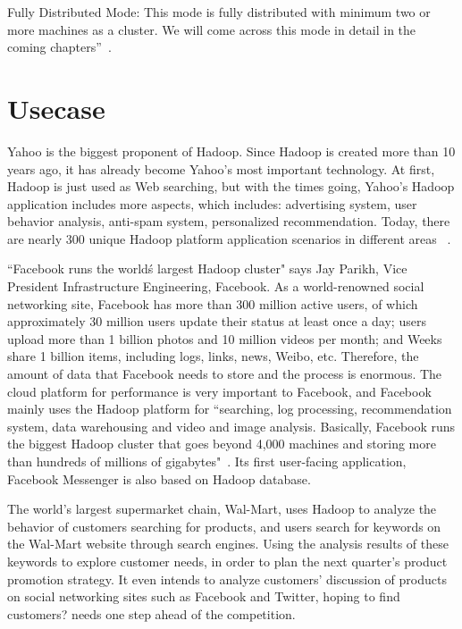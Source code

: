 Fully Distributed Mode: This mode is fully distributed with minimum two or more 
machines as a cluster. We will come across this mode in detail in the coming 
chapters''~\cite{hid-sp18-508-hadoop}. 


\section{Usecase}
Yahoo is the biggest proponent of Hadoop. Since Hadoop is created more than 10 
years ago, it has already become Yahoo's most important technology. At first, 
Hadoop is just used as Web searching, but with the times going, Yahoo's Hadoop 
application includes more aspects, which includes: advertising system, user 
behavior analysis, anti-spam system, personalized recommendation. Today, there 
are nearly 300 unique Hadoop platform application scenarios in different 
areas ~\cite{hid-sp18-508-yahoo}.

``Facebook runs the world\'s largest Hadoop cluster" says Jay Parikh, Vice President 
Infrastructure Engineering, Facebook. As a world-renowned social networking site, Facebook has 
more than 300 million active users, of which approximately 30 million users update 
their status at least once a day; users upload more than 1 billion photos and 10 
million videos per month; and Weeks share 1 billion items, including logs, links, 
news, Weibo, etc. Therefore, the amount of data that Facebook needs to store and 
the process is enormous. The cloud platform for performance is very important to Facebook, 
and Facebook mainly uses the Hadoop platform for ``searching, log processing, 
recommendation system, data warehousing and video and image analysis. Basically, 
Facebook runs the biggest Hadoop cluster that goes beyond 4,000 machines and storing 
more than hundreds of millions of gigabytes"~\cite{hid-sp18-508-fb}. Its first 
user-facing application, Facebook Messenger is also based on Hadoop database.

The world's largest supermarket chain, Wal-Mart, uses Hadoop to analyze the behavior 
of customers searching for products, and users search for keywords on the Wal-Mart 
website through search engines. Using the analysis results of these keywords to 
explore customer needs, in order to plan the next quarter's product promotion strategy. 
It even intends to analyze customers' discussion of products on social networking 
sites such as Facebook and Twitter, hoping to find customers? needs one step ahead 
of the competition.




